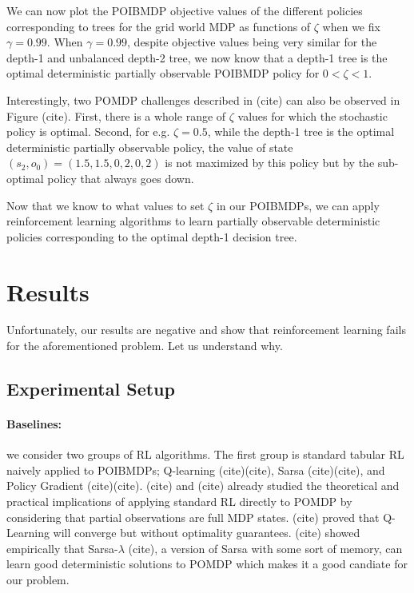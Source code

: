 We can now plot the POIBMDP objective values of the different policies corresponding to trees for the grid world MDP as functions of $\zeta$ when we fix $\gamma=0.99$. 
When $\gamma=0.99$, despite objective values being very similar for the depth-1 and unbalanced depth-2 tree, we now know that {\color{blue}a depth-1 tree is the optimal deterministic partially observable POIBMDP policy for $0< \zeta < 1$}.

Interestingly, two POMDP challenges described in (cite) can also be observed in Figure (cite). 
First, there is a whole range of $\zeta$ values for which the stochastic policy is optimal.
Second, for e.g. $\zeta=0.5$, while the depth-1 tree is the optimal deterministic partially observable policy, the value of state $(s_2, o_0) = (1.5, 1.5, 0, 2, 0, 2)$ is not maximized by this policy but by the sub-optimal policy that always goes down.

Now that we know to what values to set $\zeta$ in our POIBMDPs, we can apply reinforcement learning algorithms to learn partially observable deterministic policies corresponding to the optimal depth-1 decision tree.

\section{Results}

Unfortunately, our results are negative and show that reinforcement learning fails for the aforementioned problem. Let us understand why.

\subsection{Experimental Setup}

\paragraph{Baselines:} we consider two groups of RL algorithms. The first group is standard tabular RL naively applied to POIBMDPs; Q-learning (cite)(cite), Sarsa (cite)(cite), and Policy Gradient (cite)(cite).
(cite) and (cite) already studied the theoretical and practical implications of applying standard RL directly to POMDP by considering that partial observations are full MDP states.
(cite) proved that Q-Learning will converge but without optimality guarantees. 
(cite) showed empirically that Sarsa-$\lambda$ (cite), a version of Sarsa with some sort of memory, can learn good deterministic solutions to POMDP which makes it a good candiate for our problem.

